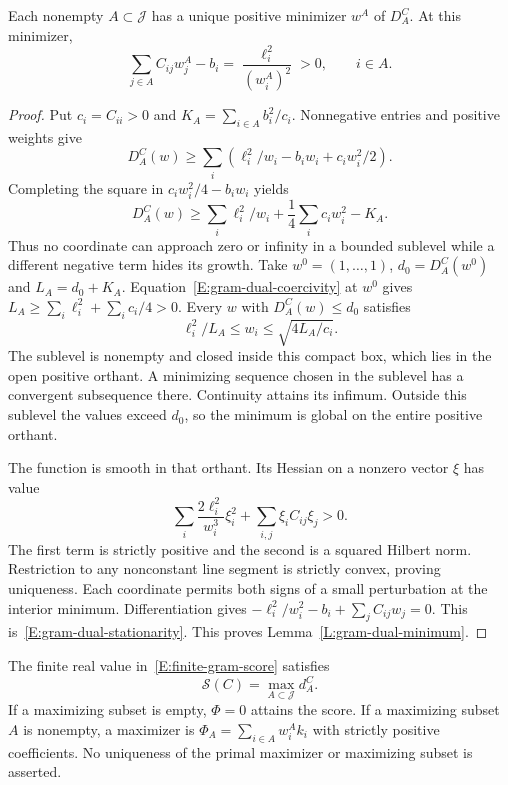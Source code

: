 \begin{lemma}\label{L:gram-dual-minimum}
  Each nonempty $A\subset\mathcal J$ has a unique positive minimizer
  $w^A$ of $D_A^C$. At this minimizer,
  \begin{equation}\label{E:gram-dual-stationarity}
    \sum_{j\in A}C_{ij}w_j^A-b_i
    =\frac{\ell_i^2}{(w_i^A)^2}>0,\qquad i\in A.
  \end{equation}
\end{lemma}

\begin{proof}
  Put $c_i=C_{ii}>0$ and $K_A=\sum_{i\in A}b_i^2/c_i$.
  Nonnegative entries and positive weights give
  \[
    D_A^C(w)\ge
    \sum_i\left(\ell_i^2/w_i-b_iw_i+c_iw_i^2/2\right).
  \]
  Completing the square in $c_iw_i^2/4-b_iw_i$ yields
  \begin{equation}\label{E:gram-dual-coercivity}
    D_A^C(w)\ge
    \sum_i\ell_i^2/w_i+\frac14\sum_i c_iw_i^2-K_A.
  \end{equation}
  Thus no coordinate can approach zero or infinity in a bounded sublevel
  while a different negative term hides its growth.
  Take $w^0=(1,\ldots,1)$, $d_0=D_A^C(w^0)$ and $L_A=d_0+K_A$.
  Equation~\eqref{E:gram-dual-coercivity} at $w^0$ gives
  $L_A\ge\sum_i\ell_i^2+\sum_i c_i/4>0$.
  Every $w$ with $D_A^C(w)\le d_0$ satisfies
  \[
    \ell_i^2/L_A\le w_i\le\sqrt{4L_A/c_i}.
  \]
  The sublevel is nonempty and closed inside this compact box, which
  lies in the open positive orthant. A minimizing sequence chosen in
  the sublevel has a convergent subsequence there. Continuity attains
  its infimum. Outside this sublevel the values exceed $d_0$, so the
  minimum is global on the entire positive orthant.

  The function is smooth in that orthant.
  Its Hessian on a nonzero vector $\xi$ has value
  \[
    \sum_i\frac{2\ell_i^2}{w_i^3}\xi_i^2
    +\sum_{i,j}\xi_iC_{ij}\xi_j>0.
  \]
  The first term is strictly positive and the second is a squared
  Hilbert norm. Restriction to any nonconstant line segment is
  strictly convex, proving uniqueness.
  Each coordinate permits both signs of a small perturbation at the
  interior minimum. Differentiation gives
  $-\ell_i^2/w_i^2-b_i+\sum_jC_{ij}w_j=0$.
  This is~\eqref{E:gram-dual-stationarity}.
  This proves Lemma~\ref{L:gram-dual-minimum}.
\end{proof}

\begin{proposition}\label{P:gram-positive-optimizer}
  The finite real value in~\eqref{E:finite-gram-score} satisfies
  \begin{equation}\label{E:gram-active-duality}
    \mathscr S(C)=\max_{A\subset\mathcal J}d_A^C .
  \end{equation}
  If a maximizing subset is empty, $\Phi=0$ attains the score.
  If a maximizing subset $A$ is nonempty, a maximizer is
  $\Phi_A=\sum_{i\in A}w_i^A k_i$ with strictly positive coefficients.
  No uniqueness of the primal maximizer or maximizing subset is asserted.
\end{proposition}

